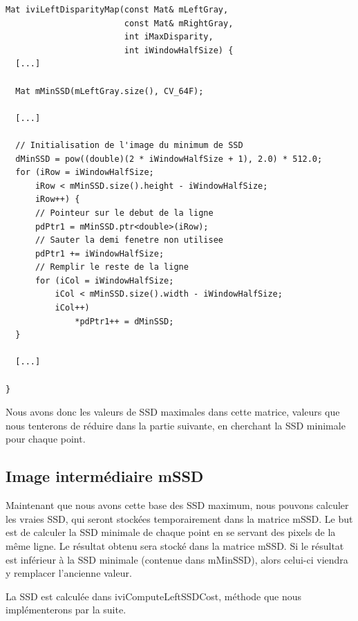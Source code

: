 \documentclass[a4paper]{article}
\begin{document}
\begin{lstlisting}
Mat iviLeftDisparityMap(const Mat& mLeftGray,
                        const Mat& mRightGray,
                        int iMaxDisparity,
                        int iWindowHalfSize) {
  [...]

  Mat mMinSSD(mLeftGray.size(), CV_64F);

  [...]

  // Initialisation de l'image du minimum de SSD
  dMinSSD = pow((double)(2 * iWindowHalfSize + 1), 2.0) * 512.0;
  for (iRow = iWindowHalfSize;
      iRow < mMinSSD.size().height - iWindowHalfSize;
      iRow++) {
      // Pointeur sur le debut de la ligne
      pdPtr1 = mMinSSD.ptr<double>(iRow);
      // Sauter la demi fenetre non utilisee
      pdPtr1 += iWindowHalfSize;
      // Remplir le reste de la ligne
      for (iCol = iWindowHalfSize;
          iCol < mMinSSD.size().width - iWindowHalfSize;
          iCol++)
              *pdPtr1++ = dMinSSD;
  }

  [...]

}
\end{lstlisting}

Nous avons donc les valeurs de SSD maximales dans cette matrice, valeurs que nous tenterons de réduire dans la partie suivante, en cherchant la SSD minimale pour chaque point.

\subsection{Image intermédiaire mSSD}

Maintenant que nous avons cette base des SSD maximum, nous pouvons calculer les vraies SSD, qui seront stockées temporairement dans la matrice mSSD.
Le but est de calculer la SSD minimale de chaque point en se servant des pixels de la même ligne. Le résultat obtenu sera stocké dans la matrice mSSD. Si le résultat est inférieur à la SSD minimale (contenue dans mMinSSD), alors celui-ci viendra y remplacer l'ancienne valeur.

La SSD est calculée dans iviComputeLeftSSDCost, méthode que nous implémenterons par la suite.
\end{document}
